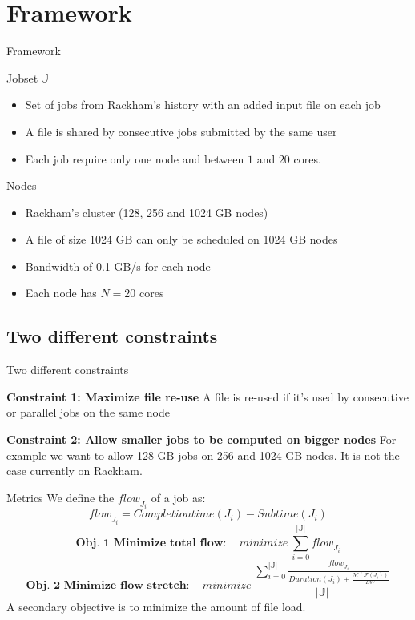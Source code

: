 \documentclass{libs/ufc_format}
\newcommand{\flow}[1]{\ensuremath{\mathit{flow}_{#1}}\xspace}
\newcommand{\inputs}{\ensuremath{\mathcal{F}}\xspace}
\newcommand{\memory}{\ensuremath{\mathcal{M}}\xspace}
\newcommand{\duration}{\mathit{Duration}\xspace}
\newcommand{\bandwidth}{\mathit{BW}\xspace}
\newcommand{\submissiontime}{\mathit{Subtime}\xspace}
\newcommand{\completiontime}{\mathit{Completiontime}\xspace}
\newcommand{\jobset}{\ensuremath{\mathbb{J}}\xspace}
\begin{document}
{\section{Framework}
\begin{frame}{Framework}
	\begin{block}{Jobset \jobset}
		\begin{itemize}
			\item Set of jobs from Rackham's history with an added input file on each job
			\item A file is shared by consecutive jobs submitted by the same user
			\item Each job require only one node and between $1$ and $20$ cores.
		\end{itemize}
	\end{block}
	\begin{block}{Nodes}
		\begin{itemize}
			\item Rackham's cluster (128, 256 and 1024 GB nodes)
			\item A file of size 1024 GB can only be scheduled on 1024 GB nodes
			\item Bandwidth of 0.1 GB/s for each node
			\item Each node has $N = 20$ cores
		\end{itemize}
	\end{block}
\end{frame}


\subsection{Two different constraints}
\begin{frame}{Two different constraints}

\begin{block}{\bf Constraint 1: Maximize file re-use}
	A file is re-used if it's used by consecutive or parallel jobs on the same node
\end{block}

\begin{block}{\bf Constraint 2: Allow smaller jobs to be computed on bigger nodes}
For example we want to allow 128 GB jobs on 256 and 1024 GB nodes. It is not the case
currently on Rackham.
\end{block}
\end{frame}
\begin{frame}{Metrics}
		We define the \flow{J_i} of a job as:
		$$
			\flow{J_i} = \completiontime(J_i) - \submissiontime(J_i)
		$$
		$$
			\textbf{Obj. 1 Minimize total flow}: \quad \mathit{minimize}~\sum_{i=0}^{|\jobset|}\flow{J_i}
		$$
		$$
			\textbf{Obj. 2 Minimize flow stretch}: \quad \mathit{minimize}~\frac{\sum_{i=0}^{|\jobset|}\frac{\flow{J_i}}{\duration(J_i) + \frac{\memory(\inputs(J_i))}{\bandwidth}}}{|\jobset|}
		$$
A secondary objective is to minimize the amount of file load.



\end{frame}}
\end{document}
